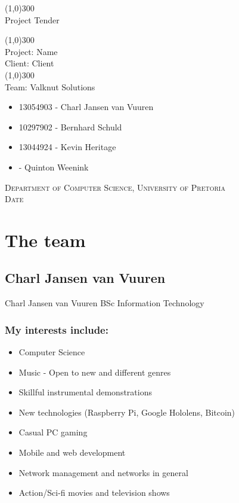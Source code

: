 \documentclass{article}
\begin{document}
	\begin{titlepage}
		\begin{center}
		
			\line(1,0){300}\\
			[6mm]
			\huge{
			Project Tender\\
			}
			
			\line(1,0){300}\\
			\huge{Project: Name\\
			Client: Client} \\
			\line(1,0){300}\\
			\huge{Team: Valknut Solutions}
			
			\large
			{
			\begin{itemize}
			
				\item 13054903 - Charl Jansen van Vuuren 
				\item 10297902 - Bernhard Schuld      
				\item 13044924 - Kevin Heritage
				\item 	- Quinton Weenink
			\end{itemize}
			}
		\textsc{\large  Department of Computer Science, University of Pretoria}\\
		[0.5cm]
		\textsc{\large Date}	
		\end{center}

			
	\end{titlepage}
	\cleardoublepage
	\tableofcontents
	
	\cleardoublepage
	\section{The team}
	\subsection{Charl Jansen van Vuuren}
	Charl Jansen van Vuuren
	BSc Information Technology
	\subsubsection{My interests include:}
	\begin{itemize}
		\item Computer Science
		\item Music - Open to new and different genres\
		\item Skillful instrumental demonstrations
		\item New technologies (Raspberry Pi, Google Hololens, Bitcoin)
		\item Casual PC gaming
		\item Mobile and web development
		\item Network management and networks in general
		\item Action/Sci-fi movies and television shows
	\end{itemize}
\end{document}
